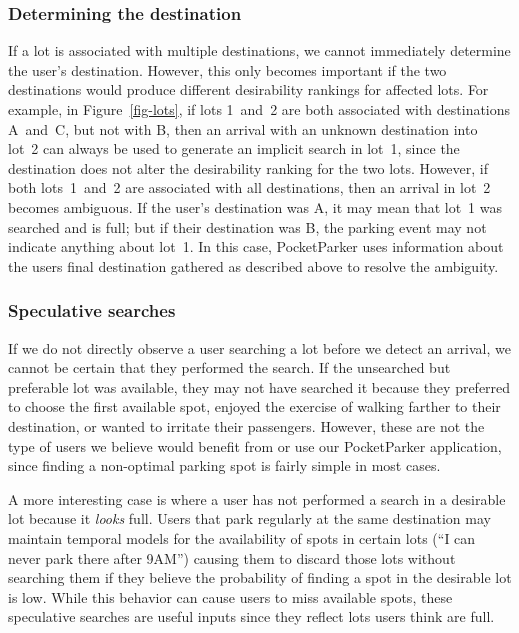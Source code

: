 \subsubsection{Determining the destination}

If a lot is associated with multiple destinations, we cannot immediately
determine the user's destination. However, this only becomes important if the
two destinations would produce different desirability rankings for affected
lots. For example, in Figure~\ref{fig-lots}, if lots 1~and~2 are both
associated with destinations A~and~C, but not with B, then an arrival with an
unknown destination into lot~2 can always be used to generate an implicit
search in lot~1, since the destination does not alter the desirability
ranking for the two lots. However, if both lots~1~and~2 are associated with
all destinations, then an arrival in lot~2 becomes ambiguous. If the user's
destination was A, it may mean that lot~1 was searched and is full; but if
their destination was B, the parking event may not indicate anything about
lot~1. In this case, PocketParker uses information about the users final
destination gathered as described above to resolve the ambiguity.

\subsubsection{Speculative searches}

If we do not directly observe a user searching a lot before we detect an
arrival, we cannot be certain that they performed the search. If the
unsearched but preferable lot was available, they may not have searched it
because they preferred to choose the first available spot, enjoyed the
exercise of walking farther to their destination, or wanted to irritate
their passengers. However, these are not the type of users we believe
would benefit from or use our PocketParker application, since finding a
non-optimal parking spot is fairly simple in most cases.

A more interesting case is where a user has not performed a search in a
desirable lot because it \textit{looks} full. Users that park regularly at
the same destination may maintain temporal models for the availability of
spots in certain lots (``I can never park there after 9AM'') causing them to
discard those lots without searching them if they believe the probability of
finding a spot in the desirable lot is low. While this behavior can cause
users to miss available spots, these speculative searches are useful inputs
since they reflect lots users think are full.

